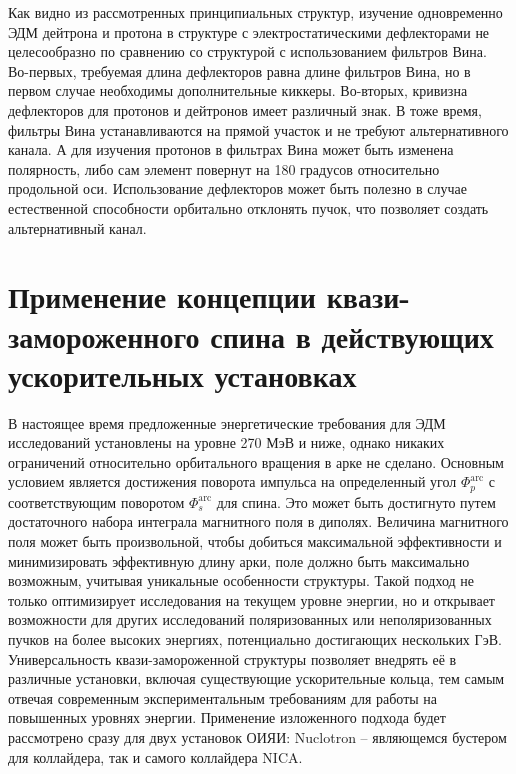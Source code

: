 \par  Как видно из рассмотренных принципиальных структур, изучение одновременно ЭДМ дейтрона и протона в структуре с электростатическими дефлекторами не целесообразно по сравнению со структурой с использованием фильтров Вина. Во-первых, требуемая длина дефлекторов равна длине фильтров Вина, но в первом случае необходимы дополнительные киккеры. Во-вторых, кривизна дефлекторов для протонов и дейтронов имеет различный знак. В тоже время, фильтры Вина устанавливаются на прямой участок и не требуют альтернативного канала. А для изучения протонов в фильтрах Вина может быть изменена полярность, либо сам элемент повернут на 180 градусов относительно продольной оси. Использование дефлекторов может быть полезно в случае естественной способности орбитально отклонять пучок, что позволяет создать альтернативный канал.

	\section{Применение концепции квази-замороженного спина в действующих ускорительных установках}\label{sec:EDM/nuclotron}

\par В настоящее время предложенные энергетические требования для ЭДМ исследований установлены на уровне 270 МэВ и ниже, однако никаких ограничений относительно орбитального вращения в арке не сделано. Основным условием является достижения поворота импульса на определенный угол $\Phi_p^{\textrm{arc}}$ с соответствующим поворотом $\Phi_s^{\textrm{arc}}$ для спина. Это может быть достигнуто путем достаточного набора интеграла магнитного поля в диполях. Величина магнитного поля может быть произвольной, чтобы добиться максимальной эффективности и минимизировать эффективную длину арки, поле должно быть максимально возможным, учитывая уникальные особенности структуры. Такой подход не только оптимизирует исследования на текущем уровне энергии, но и открывает возможности для других исследований поляризованных или неполяризованных пучков на более высоких энергиях, потенциально достигающих нескольких ГэВ. Универсальность квази-замороженной структуры позволяет внедрять её в различные установки, включая существующие ускорительные кольца, тем самым отвечая современным экспериментальным требованиям для работы на повышенных уровнях энергии. Применение изложенного подхода будет рассмотрено сразу для двух установок ОИЯИ: Nuclotron -- являющемся бустером для коллайдера, так и самого коллайдера NICA. 

